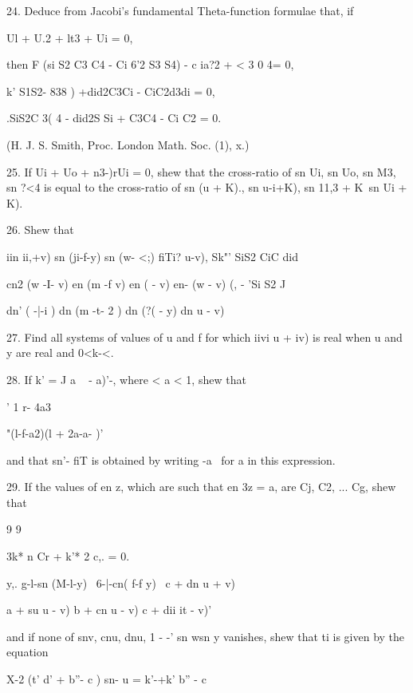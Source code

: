 
24. Deduce from Jacobi's fundamental Theta-function formulae that, if

Ul + U.2 + lt3 + Ui = 0,

then F (si S2 C3 C4 - Ci 6'2 S3 S4) - c ia?2 + < 3 0 4= 0,

k' S1S2- 838 ) +did2C3Ci - CiC2d3di = 0,

.SiS2C 3( 4 - did2S Si + C3C4 - Ci C2 = 0.

(H. J. S. Smith, Proc. London Math. Soc. (1), x.)

25. If Ui + Uo + n3-)rUi = 0, shew that the cross-ratio of sn Ui, sn
Uo, sn M3, sn ?<4 is equal to the cross-ratio of sn (u + K)., sn
u-i+K), sn 11,3 + K\ sn Ui + K).


26. Shew that

iin ii,+v) sn (ji-f-y) sn (w- <;) fiTi? u-v), Sk"' SiS2 CiC did

cn2 (w -I- v) en (m -f v) en ( - v) en- (w - v) (, - 'Si S2 J

dn' ( -|-i ) dn (m -t- 2 ) dn (?( - y) dn u - v)


27. Find all systems of values of u and f for which iivi u + iv) is
real when u and y are real and 0<k-<. 

28. If k' = J a ~ - a)'-, where < a < 1, shew that

' 1 r- 4a3

 "(l-f-a2)(l + 2a-a- )'

and that sn'- fiT is obtained by writing -a~ for a in this expression.


29. If the values of en z, which are such that en 3z = a, are Cj, C2,
... Cg, shew that

9 9

3k* n Cr + k'* 2 c,. = 0.


y,. g-l-sn (M-l-y) \ 6-|-cn( f-f y) \ c + dn u + v)

a + su u - v) b + cn u - v) c + dii it - v)'

and if none of snv, cnu, dnu, 1 - -' sn wsn y vanishes, shew that ti
is given by the equation

X-2 (t' d' + b''- c ) sn- u = k'-+k' b'' - c\

